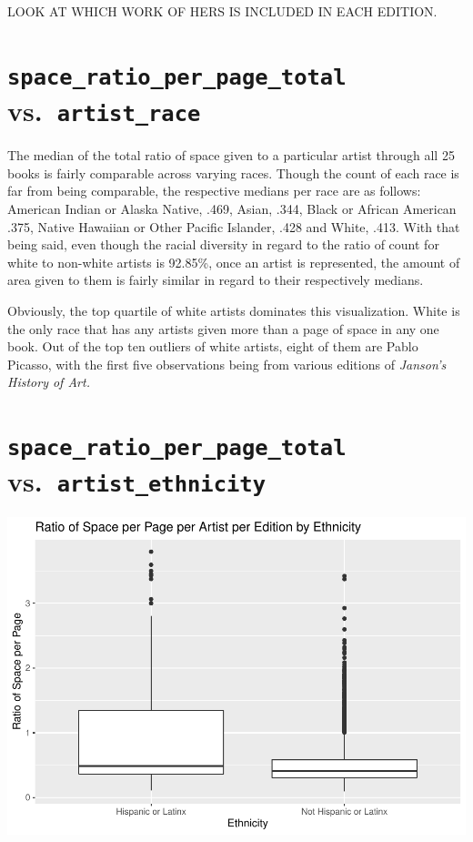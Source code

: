 \documentclass[
  letterpaper,
  DIV=11,
  numbers=noendperiod]{scrreprt}
\begin{document}
LOOK AT WHICH WORK OF HERS IS INCLUDED IN EACH EDITION.

\hypertarget{space_ratio_per_page_total-vs.-artist_race}{%
\section{\texorpdfstring{\texttt{space\_ratio\_per\_page\_total}
vs.~\texttt{artist\_race}}{space\_ratio\_per\_page\_total vs.~artist\_race}}\label{space_ratio_per_page_total-vs.-artist_race}}

The median of the total ratio of space given to a particular artist
through all 25 books is fairly comparable across varying races. Though
the count of each race is far from being comparable, the respective
medians per race are as follows: American Indian or Alaska Native, .469,
Asian, .344, Black or African American .375, Native Hawaiian or Other
Pacific Islander, .428 and White, .413. With that being said, even
though the racial diversity in regard to the ratio of count for white to
non-white artists is 92.85\%, once an artist is represented, the amount
of area given to them is fairly similar in regard to their respectively
medians.

Obviously, the top quartile of white artists dominates this
visualization. White is the only race that has any artists given more
than a page of space in any one book. Out of the top ten outliers of
white artists, eight of them are Pablo Picasso, with the first five
observations being from various editions of \emph{Janson's History of
Art.}

\hypertarget{space_ratio_per_page_total-vs.-artist_ethnicity}{%
\section{\texorpdfstring{\texttt{space\_ratio\_per\_page\_total}
vs.~\texttt{artist\_ethnicity}}{space\_ratio\_per\_page\_total vs.~artist\_ethnicity}}\label{space_ratio_per_page_total-vs.-artist_ethnicity}}

\includegraphics{Chapter1/Chapter1_files/figure-pdf/ethnicityallbooks-1.pdf}
\end{document}
